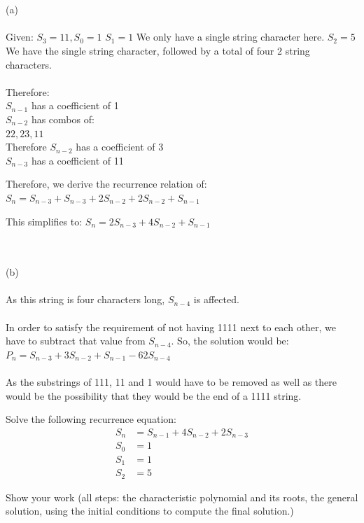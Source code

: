 \documentclass{article}
\begin{document}
\begin{solution}
\\\\ (a)
\\\\ Given: $S_3 = 11, S_0 = 1$
\newline
$S_1 = 1$ We only have a single string character here.
\newline
$S_2 = 5$ We have the single string character, followed by a total of four 2 string characters.
\newline
\\\\ Therefore:
\\ $S_{n-1} $ has a coefficient of 1
\\ $S_{n-2}$ has combos of: 
\\ $22, 23, 11$
\newline
\\ Therefore $S_{n-2}$ has a coefficient of 3
\\ $S_{n-3}$ has a coefficient of 11
\newline

Therefore, we derive the recurrence relation of:
$ S_{n} = S_{n-3} + S_{n-3} + 2S_{n-2} + 2S_{n-2} + S_{n-1} $
\newline

This simplifies to:
$S_{n} = 2S_{n-3} + 4S_{n-2} + S_{n-1}$
\newline

\\\\ (b)
\\\\As this string is four characters long, $S_{n-4}$ is affected.
\\\\In order to satisfy the requirement of not having 1111 next to each other, we have to subtract that value from $S_{n-4}$. So, the solution would be:
\newline
$P_n=S_{n-3} + 3S_{n-2} + S_{n-1} - 62S_{n-4}$
\\\\ As the substrings of 111, 11 and 1 would have to be removed as well as there would be the possibility that they would be the end of a 1111 string.

\end{solution}

\smallskip

\begin{problem}
Solve the following recurrence equation:
\smallskip
\begin{align*}
	S_n &= S_{n-1} + 4S_{n-2} + 2S_{n-3}
	\\
	S_0 &= 1
	\\
	S_1 &= 1
	\\
	S_2 &= 5
\end{align*}

\noindent Show your work (all steps: the characteristic polynomial and its roots, the general solution, 
using the initial conditions to compute the final solution.)
\end{problem}
\end{document}
